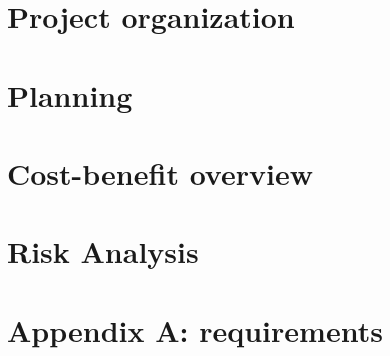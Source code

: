 \documentclass[11pt, a4paper]{report}
\begin{document}
\begin{justify}
\chapter{Project organization}
	

	\chapter{Planning}
		

\chapter{Cost-benefit overview}
	

\chapter{Risk Analysis}
	

\chapter{Appendix A: requirements}
	

	\end{justify}
\end{document}
